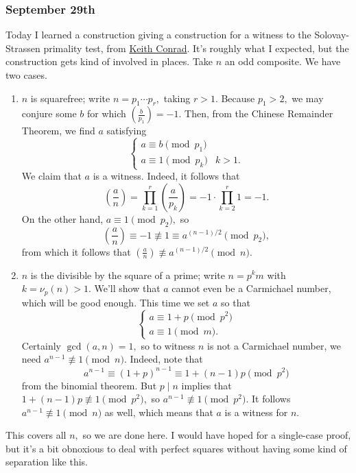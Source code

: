 \subsubsection{September 29th}
Today I learned a construction giving a construction for a witness to the Solovay-Strassen primality test, from \href{https://kconrad.math.uconn.edu/blurbs/ugradnumthy/solovaystrassen.pdf}{Keith Conrad}. It's roughly what I expected, but the construction gets kind of involved in places. Take $n$ an odd composite. We have two cases.
\begin{enumerate}[label=(\alph*)]
    \item $n$ is squarefree; write $n=p_1\cdots p_r,$ taking $r>1.$ Because $p_1>2,$ we may conjure some $b$ for which $\left(\frac b{p_1}\right)=-1.$ Then, from the Chinese Remainder Theorem, we find $a$ satisfying
    \[\begin{cases}
        a\equiv b\pmod{p_1} \\
        a\equiv1\pmod{p_k} & k>1.
    \end{cases}\]
    We claim that $a$ is a witness. Indeed, it follows that
    \[\left(\frac an\right)=\prod_{k=1}^r\left(\frac a{p_k}\right)=-1\cdot\prod_{k=2}^r1=-1.\]
    On the other hand, $a\equiv1\pmod{p_2},$ so
    \[\left(\frac an\right)\equiv-1\not\equiv1\equiv a^{(n-1)/2}\pmod{p_2},\]
    from which it follows that $\left(\frac an\right)\not\equiv a^{(n-1)/2}\pmod n.$
    
    \item $n$ is the divisible by the square of a prime; write $n=p^km$ with $k=\nu_p(n)>1.$ We'll show that $a$ cannot even be a Carmichael number, which will be good enough. This time we set $a$ so that
    \[\begin{cases}
        a \equiv 1+p\pmod{p^2} \\ 
        a \equiv 1\pmod m.
    \end{cases}\]
    Certainly $\gcd(a,n)=1,$ so to witness $n$ is not a Carmichael number, we need $a^{n-1}\not\equiv1\pmod n.$ Indeed, note that
    \[a^{n-1}\equiv(1+p)^{n-1}\equiv 1+(n-1)p\pmod{p^2}\]
    from the binomial theorem. But $p\mid n$ implies that $1+(n-1)p\not\equiv1\pmod{p^2},$ so $a^{n-1}\not\equiv1\pmod{p^2}.$ It follows $a^{n-1}\not\equiv1\pmod n$ as well, which means that $a$ is a witness for $n.$
\end{enumerate}
This covers all $n,$ so we are done here. I would have hoped for a single-case proof, but it's a bit obnoxious to deal with perfect squares without having some kind of separation like this.

